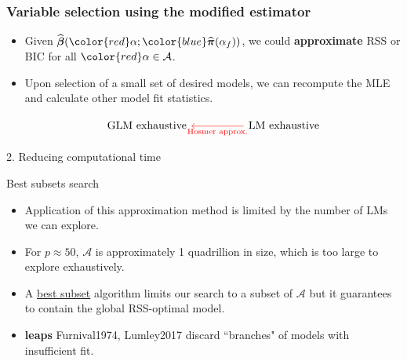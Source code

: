 \documentclass[12pt,aspectratio=169]{beamer}
\newcommand{\bbetaHat}{\widehat{\boldsymbol{\beta}}}
\newcommand{\bPiHat}{\widehat{\boldsymbol{\pi}}}
\newcommand{\alphaFull}{\alpha_{f}}
\begin{document}
\begin{frame}[fragile] %
	\frametitle{Variable selection using the modified estimator}
	\begin{itemize}
		\item Given $ \bbetaHat({\color{red}\alpha}; {\color{blue}\bPiHat(\alphaFull)}) $, we could \textbf{approximate} RSS or BIC for all $ {\color{red}\alpha} \in \mathcal{A} $. 
		
		\item Upon selection of a small set of desired models, we can recompute the MLE and calculate other model fit statistics. 
		

\vspace{0.5cm}
\begin{equation*}
\begin{tikzcd}[column sep=huge]
\text{GLM exhaustive}
& \arrow[l, red, "\text{Hosmer approx.}", red] \text{LM exhaustive}
\end{tikzcd}
\end{equation*}

\end{itemize}

\end{frame}



\begin{frame}
\Huge{\color{themeBlue} 2. Reducing computational time}
\end{frame}



\begin{frame}{Best subsets search}
	\begin{itemize}
		
		\item Application of this approximation method is limited by the number of LMs we can explore.
		
		\item For $ p \approx 50 $, $ \mathcal{A}$ is approximately 1 quadrillion in size, which is too large to explore exhaustively. 
		
		\item A \underline{best subset} algorithm limits our search to a subset of $ \mathcal{A} $ but it guarantees to contain the global RSS-optimal model.
		
		\item \textbf{leaps} Furnival1974, Lumley2017 discard ``branches" of models with insufficient fit. 
	\end{itemize}

\end{frame}
\end{document}

